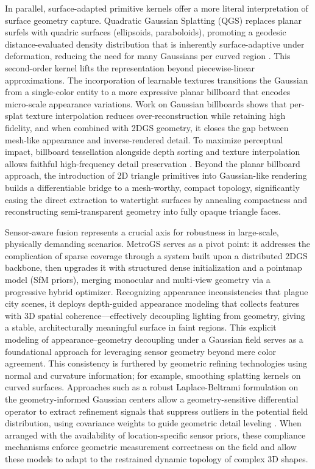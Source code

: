 \documentclass[11pt,a4paper]{article}
\begin{document}
In parallel, surface-adapted primitive kernels offer a more literal interpretation of surface geometry capture. Quadratic Gaussian Splatting (QGS) replaces planar surfels with quadric surfaces (ellipsoids, paraboloids), promoting a geodesic distance-evaluated density distribution that is inherently surface-adaptive under deformation, reducing the need for many Gaussians per curved region \cite{arxiv:2411.16392v4}. This second-order kernel lifts the representation beyond piecewise-linear approximations. The incorporation of learnable textures transitions the Gaussian from a single-color entity to a more expressive planar billboard that encodes micro-scale appearance variations. Work on Gaussian billboards \cite{arxiv:2412.12734v1,arxiv:2411.08508v4} shows that per-splat texture interpolation reduces over-reconstruction while retaining high fidelity, and when combined with 2DGS geometry, it closes the gap between mesh-like appearance and inverse-rendered detail. To maximize perceptual impact, billboard tessellation alongside depth sorting and texture interpolation allows faithful high-frequency detail preservation \cite{arxiv:2412.01823v1}. Beyond the planar billboard approach, the introduction of 2D triangle primitives into Gaussian-like rendering \cite{arxiv:2506.18575v3} builds a differentiable bridge to a mesh-worthy, compact topology, significantly easing the direct extraction to watertight surfaces by annealing compactness and reconstructing semi-transparent geometry into fully opaque triangle faces.

Sensor-aware fusion represents a crucial axis for robustness in large-scale, physically demanding scenarios. MetroGS \cite{arxiv:2511.19172v4} serves as a pivot point: it addresses the complication of sparse coverage through a system built upon a distributed 2DGS backbone, then upgrades it with structured dense initialization and a pointmap model (SfM priors), merging monocular and multi-view geometry via a progressive hybrid optimizer. Recognizing appearance inconsistencies that plague city scenes, it deploys depth-guided appearance modeling that collects features with 3D spatial coherence---effectively decoupling lighting from geometry, giving a stable, architecturally meaningful surface in faint regions. This explicit modeling of appearance--geometry decoupling under a Gaussian field serves as a foundational approach for leveraging sensor geometry beyond mere color agreement. This consistency is furthered by geometric refining technologies using normal and curvature information; for example, smoothing splatting kernels on curved surfaces. Approaches such as a robust Laplace-Beltrami formulation on the geometry-informed Gaussian centers allow a geometry-sensitive differential operator to extract refinement signals that suppress outliers in the potential field distribution, using covariance weights to guide geometric detail leveling \cite{arxiv:2502.17531v2}. When arranged with the availability of location-specific sensor priors, these compliance mechanisms enforce geometric measurement correctness on the field and allow these models to adapt to the restrained dynamic topology of complex 3D shapes.
\end{document}
